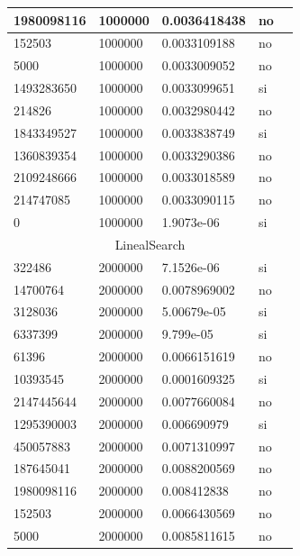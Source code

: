 \documentclass[12pt, fleqn]{article}                             %
\theoremstyle{break}                                            %
\begin{document}
\begin{longtable}{|m{5em}|m{5em}|m{10em}|m{5em}|@{}m{0pt}@{}}
            1980098116& 1000000  & 0.0036418438 & no &\\[1em]    \hline
            152503& 1000000  & 0.0033109188 & no &\\[1em]    \hline
            5000& 1000000  & 0.0033009052 & no &\\[1em]    \hline
            1493283650& 1000000  & 0.0033099651 & si &\\[1em]    \hline
            214826& 1000000  & 0.0032980442 & no &\\[1em]    \hline
            1843349527& 1000000  & 0.0033838749 & si &\\[1em]    \hline
            1360839354& 1000000  & 0.0033290386 & no &\\[1em]    \hline
            2109248666& 1000000  & 0.0033018589 & no &\\[1em]    \hline
            214747085& 1000000  & 0.0033090115 & no &\\[1em]    \hline
            0& 1000000  & 1.9073e-06 & si &\\[1em]    \hline
            \multicolumn{5}{|c|}{LinealSearch}   \\          \hline
            322486& 2000000  & 7.1526e-06 & si &\\[1em]    \hline
            14700764& 2000000  & 0.0078969002 & no &\\[1em]    \hline
            3128036& 2000000  & 5.00679e-05 & si &\\[1em]    \hline
            6337399& 2000000  & 9.799e-05 & si &\\[1em]    \hline
            61396& 2000000  & 0.0066151619 & no &\\[1em]    \hline
            10393545& 2000000  & 0.0001609325 & si &\\[1em]    \hline
            2147445644& 2000000  & 0.0077660084 & no &\\[1em]    \hline
            1295390003& 2000000  & 0.006690979 & si &\\[1em]    \hline
            450057883& 2000000  & 0.0071310997 & no &\\[1em]    \hline
            187645041& 2000000  & 0.0088200569 & no &\\[1em]    \hline
            1980098116& 2000000  & 0.008412838 & no &\\[1em]    \hline
            152503& 2000000  & 0.0066430569 & no &\\[1em]    \hline
            5000& 2000000  & 0.0085811615 & no &\\[1em]    \hline

\end{longtable}
\end{document}
